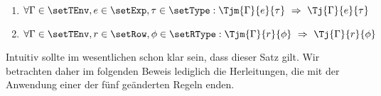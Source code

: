 \begin{satz} \label{satz:Lom:Korrektheit} \
  \begin{enumerate}
    \item $\forall \Gamma\in\setTEnv,e\in\setExp,\tau\in\setType:
            \Tjm{\Gamma}{e}{\tau} \ \Rightarrow \ \Tj{\Gamma}{e}{\tau}$
    \item $\forall \Gamma\in\setTEnv,r\in\setRow,\phi\in\setRType:
            \Tjm{\Gamma}{r}{\phi} \ \Rightarrow \ \Tj{\Gamma}{r}{\phi}$
  \end{enumerate}
\end{satz}
%
Intuitiv sollte im wesentlichen schon klar sein, dass dieser Satz gilt. Wir betrachten daher im folgenden Beweis
lediglich die Herleitungen, die mit der Anwendung einer der f\"unf ge\"anderten Regeln enden.

